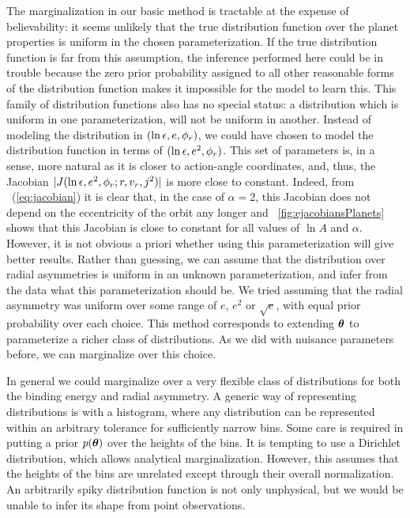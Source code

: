 The marginalization in our basic method is tractable at the expense of
believability: it seems unlikely that the true distribution function
over the planet properties is uniform in the chosen
parameterization. If the true distribution function is far from this
assumption, the inference performed here could be in trouble because
the zero prior probability assigned to all other reasonable forms of
the distribution function makes it impossible for the model to learn
this. This family of distribution functions also has no special
status: a distribution which is uniform in one parameterization, will
not be uniform in another. Instead of modeling the distribution in
$(\ln{\epsilon}, e,\phi_r)$, we could have chosen to model the
distribution function in terms of $(\ln{\epsilon},e^2,\phi_r)$. This set
of parameters is, in a sense, more natural as it is closer to
action-angle coordinates, and, thus, the Jacobian
$|J(\ln{\epsilon},e^2,\phi_r;r,v_r,j^2)|$ is more close to
constant. Indeed, from \eqnname~(\ref{eq:jacobian}) it is clear that,
in the case of $\alpha = 2$, this Jacobian does not depend on the
eccentricity of the orbit any longer and
\figurename~\ref{fig:ejacobiansPlanets} shows that this Jacobian is
close to constant for all values of $\ln A$ and $\alpha$. However, it
is not obvious a priori whether using this parameterization will give
better results.  Rather than guessing, we can assume that the
distribution over radial asymmetries is uniform in an unknown
parameterization, and infer from the data what this parameterization
should be. We tried assuming that the radial asymmetry was uniform
over some range of $e$, $e^2$ or $\sqrt{e}$, with equal prior
probability over each choice. This method corresponds to extending
$\boldsymbol{{\theta}}$ to parameterize a richer class of distributions. As we did
with nuisance parameters before, we can marginalize over this choice.

In general we could marginalize over a very flexible class of
distributions for both the binding energy and radial asymmetry. A
generic way of representing distributions is with a histogram, where
any distribution can be represented within an arbitrary tolerance for
sufficiently narrow bins. Some care is required in putting a prior
$p(\boldsymbol{{\theta}})$ over the heights of the bins. It is tempting to use a
Dirichlet distribution, which allows analytical marginalization.
However, this assumes that the heights of the bins are unrelated
except through their overall normalization. An arbitrarily spiky
distribution function is not only unphysical, but we would be unable
to infer its shape from point observations.

